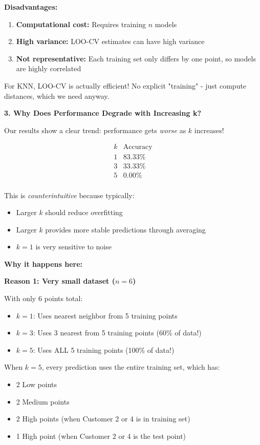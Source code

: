 \documentclass[12pt]{article}
\begin{document}
\begin{explanation}
\textbf{Disadvantages:}
\begin{enumerate}
    \item \textbf{Computational cost:} Requires training \(n\) models
    \item \textbf{High variance:} LOO-CV estimates can have high variance
    \item \textbf{Not representative:} Each training set only differs by one point, so models are highly correlated
\end{enumerate}

For KNN, LOO-CV is actually efficient! No explicit "training" - just compute distances, which we need anyway.

\textbf{3. Why Does Performance Degrade with Increasing k?}

Our results show a clear trend: performance gets \textit{worse} as \(k\) increases!

\[
\begin{array}{c|c}
k & \text{Accuracy} \\
\hline
1 & 83.33\% \\
3 & 33.33\% \\
5 & 0.00\% \\
\end{array}
\]

This is \textit{counterintuitive} because typically:
\begin{itemize}
    \item Larger \(k\) should reduce overfitting
    \item Larger \(k\) provides more stable predictions through averaging
    \item \(k=1\) is very sensitive to noise
\end{itemize}

\textbf{Why it happens here:}

\textbf{Reason 1: Very small dataset (\(n=6\))}

With only 6 points total:
\begin{itemize}
    \item \(k=1\): Uses nearest neighbor from 5 training points
    \item \(k=3\): Uses 3 nearest from 5 training points (60\% of data!)
    \item \(k=5\): Uses ALL 5 training points (100\% of data!)
\end{itemize}

When \(k=5\), every prediction uses the entire training set, which has:
\begin{itemize}
    \item 2 Low points
    \item 2 Medium points
    \item 2 High points (when Customer 2 or 4 is in training set)
    \item 1 High point (when Customer 2 or 4 is the test point)
\end{itemize}


\end{explanation}
\end{document}

